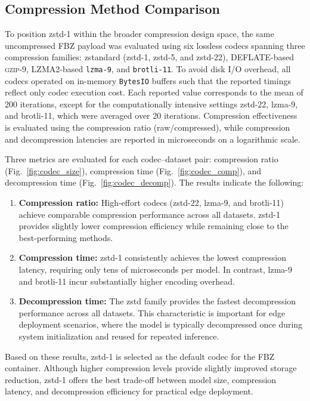\documentclass[journal,twoside,web]{ieeecolor}
\begin{document}
\subsection{Compression Method Comparison}
\label{sec:res-codecs}

To position zstd-1 within the broader compression design space,
the same uncompressed FBZ payload was evaluated using six
lossless codecs spanning three compression families: zstandard
(zstd-1, zstd-5, and zstd-22), DEFLATE-based \textsc{gzip}-9,
LZMA2-based \texttt{lzma-9}, and \texttt{brotli-11}. To avoid
disk I/O overhead, all codecs operated on in-memory
\texttt{BytesIO} buffers such that the reported timings reflect
only codec execution cost. Each reported value corresponds to the
mean of 200 iterations, except for the computationally intensive
settings zstd-22, lzma-9, and brotli-11, which were averaged over
20 iterations. Compression effectiveness is evaluated using the
compression ratio (raw/compressed), while compression and
decompression latencies are reported in microseconds on a
logarithmic scale.

Three metrics are evaluated for each codec--dataset pair:
compression ratio (Fig.~\ref{fig:codec_size}), compression time
(Fig.~\ref{fig:codec_comp}), and decompression time
(Fig.~\ref{fig:codec_decomp}). The results indicate the following:

\begin{enumerate}
    \item \textbf{Compression ratio:} High-effort codecs
    (zstd-22, lzma-9, and brotli-11) achieve comparable compression
    performance across all datasets. zstd-1 provides slightly lower
    compression efficiency while remaining close to the
    best-performing methods.

    \item \textbf{Compression time:} zstd-1 consistently achieves
    the lowest compression latency, requiring only tens of
    microseconds per model. In contrast, lzma-9 and brotli-11 incur
    substantially higher encoding overhead.

    \item \textbf{Decompression time:} The zstd family provides the
    fastest decompression performance across all datasets. This
    characteristic is important for edge deployment scenarios,
    where the model is typically decompressed once during system
    initialization and reused for repeated inference.
\end{enumerate}

Based on these results, zstd-1 is selected as the default codec for
the FBZ container. Although higher compression levels provide
slightly improved storage reduction, zstd-1 offers the best trade-off
between model size, compression latency, and decompression
efficiency for practical edge deployment.
\end{document}
